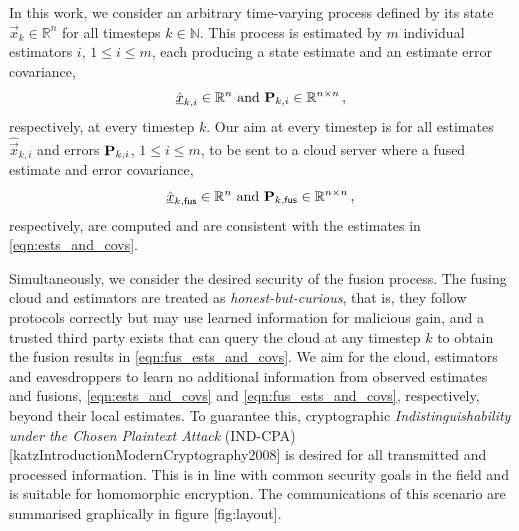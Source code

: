 In this work, we consider an arbitrary time-varying process defined by its state $\vec{x}_k \in \mathbb{R}^n$ for all timesteps $k \in \mathbb{N}$. This process is estimated by $m$ individual estimators $i$, $1\leq i\leq m$, each producing a state estimate and an estimate error covariance,
\begin{equation}\label{eqn:ests_and_covs}
    \hat{{\underline{x}}}_{k,i} \in \mathbb{R}^n \text{ and } {\ensuremath{{\mathbf{P}}}}_{k,i} \in \mathbb{R}^{n\times n}\,,
\end{equation}
respectively, at every timestep $k$. Our aim at every timestep is for all estimates $\hat{\vec{x}}_{k,i}$ and errors ${{\mathbf{P}}}_{k,i}$, $1\leq i\leq m$, to be sent to a cloud server where a fused estimate and error covariance,
\begin{equation}\label{eqn:fus_ests_and_covs}
    \hat{{\underline{x}}}_{k,\mathsf{fus}} \in \mathbb{R}^n \text{ and } {\ensuremath{{\mathbf{P}}}}_{k,\mathsf{fus}} \in \mathbb{R}^{n\times n}\,,
\end{equation}
respectively, are computed and are consistent with the estimates in \eqref{eqn:ests_and_covs}.

Simultaneously, we consider the desired security of the fusion process. The fusing cloud and estimators are treated as \textit{honest-but-curious}, that is, they follow protocols correctly but may use learned information for malicious gain, and a trusted third party exists that can query the cloud at any timestep $k$ to obtain the fusion results in \eqref{eqn:fus_ests_and_covs}. We aim for the cloud, estimators and eavesdroppers to learn no additional information from observed estimates and fusions, \eqref{eqn:ests_and_covs} and \eqref{eqn:fus_ests_and_covs}, respectively, beyond their local estimates. To guarantee this, cryptographic \textit{Indistinguishability under the Chosen Plaintext Attack} (IND-CPA) [katzIntroductionModernCryptography2008] is desired for all transmitted and processed information. This is in line with common security goals in the field and is suitable for homomorphic encryption. The communications of this scenario are summarised graphically in figure [fig:layout].

